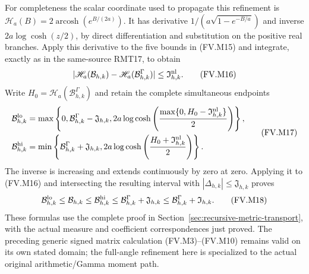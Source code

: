 For completeness the scalar coordinate used to propagate this refinement
is $\mathscr H_a(B)=2\operatorname{arcosh}(e^{B/(2a)})$.
It has derivative $1/(a\sqrt{1-e^{-B/a}})$ and inverse
$2a\log\cosh(z/2)$, by direct differentiation and substitution on the
positive real branches. Apply this derivative to the five bounds in
(FV.M15) and integrate, exactly as in the same-source RMT17, to obtain
\[
 |\mathscr H_a(\mathcal B_{h,k})
           -\mathscr H_a(\mathcal B^\Gamma_{h,k})|
       \le\mathfrak I_{h,k}^{\rm nl}.
 \tag{FV.M16}\label{fvmetric:recursive-coordinate}
\]
Write $H_0=\mathscr H_a(\mathcal B^\Gamma_{h,k})$ and retain the
complete simultaneous endpoints
\[
 \begin{aligned}
 \mathcal B_{h,k}^{\rm lo}
 &=\max\left\{0,\mathcal B^\Gamma_{h,k}-\mathfrak J_{h,k},
 2a\log\cosh\left(\frac{\max\{0,H_0-\mathfrak I_{h,k}^{\rm nl}\}}2\right)
                                                        \right\},\\
 \mathcal B_{h,k}^{\rm hi}
 &=\min\left\{\mathcal B^\Gamma_{h,k}+\mathfrak J_{h,k},
 2a\log\cosh\left(\frac{H_0+\mathfrak I_{h,k}^{\rm nl}}2\right)
                                                        \right\}.
 \end{aligned}\tag{FV.M17}\label{fvmetric:recursive-endpoints}
\]
The inverse is increasing and extends continuously by zero at zero.
Applying it to (FV.M16) and intersecting the resulting interval with
$|\Delta_{h,k}|\le\mathfrak J_{h,k}$ proves
\[
 \mathcal B_{h,k}^{\rm lo}\le\mathcal B_{h,k}
 \le\mathcal B_{h,k}^{\rm hi}
 \le\mathcal B^\Gamma_{h,k}+\mathfrak J_{h,k}
 \le\mathcal B^\Gamma_{h,k}+\mathfrak I_{h,k}.
 \tag{FV.M18}\label{fvmetric:recursive-budget}
\]
These formulas use the complete proof in
Section~\ref{sec:recursive-metric-transport}, with the actual measure
and coefficient correspondences just proved. The preceding generic
signed matrix calculation (FV.M3)--(FV.M10) remains valid on its own
stated domain; the full-angle refinement here is specialized to the
actual original arithmetic/Gamma moment path.
